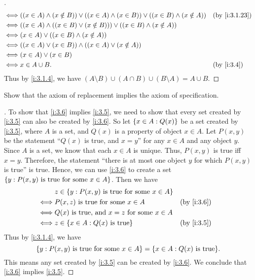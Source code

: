 \begin{proof}[]
\begin{align*}
    \iff & ((x \in A) \land (x \notin B)) \lor ((x \in A) \land (x \in B)) \lor ((x \in B) \land (x \notin A)) &  & \by{i:3.1.23} \\
    \iff & ((x \in A) \land ((x \in B) \lor (x \notin B))) \lor ((x \in B) \land (x \notin A))                                    \\
    \iff & (x \in A) \lor ((x \in B) \land (x \notin A))                                                                          \\
    \iff & ((x \in A) \lor (x \in B)) \land ((x \in A) \lor (x \notin A))                                                         \\
    \iff & (x \in A) \lor (x \in B)                                                                                               \\
    \iff & x \in A \cup B.                                                                                     &  & \by{i:3.4}
  \end{align*}
  Thus by \cref{i:3.1.4}, we have \((A \setminus B) \cup (A \cap B) \cup (B \setminus A) = A \cup B\).
\end{proof}

\begin{ex}\label{i:ex:3.1.11}
  Show that the axiom of replacement implies the axiom of specification.
\end{ex}

\begin{proof}[]
  To show that \cref{i:3.6} implies \cref{i:3.5}, we need to show that every set created by \cref{i:3.5} can also be created by \cref{i:3.6}.
  So let \(\left\lbrace x \in A : Q(x)\right\rbrace\) be a set created by \cref{i:3.5}, where \(A\) is a set, and \(Q(x)\) is a property of object \(x \in A\).
  Let \(P(x, y)\) be the statement ``\(Q(x)\) is true, and \(x = y\)'' for any \(x \in A\) and any object \(y\).
  Since \(A\) is a set, we know that each \(x \in A\) is unique.
  Thus, \(P(x, y)\) is true iff \(x = y\).
  Therefore, the statement ``there is at most one object \(y\) for which \(P(x, y)\) is true'' is true.
  Hence, we can use \cref{i:3.6} to create a set \(\left\lbrace y : P(x, y) \text{ is true for some } x \in A\right\rbrace\).
  Then we have
  \begin{align*}
         & z \in \set{y : P(x, y) \text{ is true for some } x \in A}                  \\
    \iff & P(x, z) \text{ is true for some } x \in A                  &  & \by{i:3.6} \\
    \iff & Q(x) \text{ is true, and } x = z \text{ for some } x \in A                 \\
    \iff & z \in \set{x \in A : Q(x) \text{ is true}}                 &  & \by{i:3.5}
  \end{align*}
  Thus by \cref{i:3.1.4}, we have
  \[
    \set{y : P(x, y) \text{ is true for some } x \in A} = \set{x \in A : Q(x) \text{ is true}}.
  \]
  This means any set created by \cref{i:3.5} can be created by \cref{i:3.6}.
  We conclude that \cref{i:3.6} implies \cref{i:3.5}.
\end{proof}

